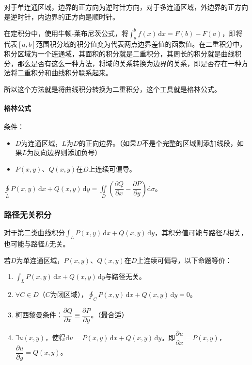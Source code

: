 \documentclass[UTF8, 12pt]{ctexart}
\begin{document}
对于单连通区域，边界的正方向为逆时针方向，对于多连通区域，外边界的正方向是逆时针，内边界的正方向是顺时针。

在定积分中，使用牛顿-莱布尼茨公式，将$\int_a^bf(x)\,\textrm{d}x=F(b)-F(a)$，即将代表$[a,b]$范围积分域的积分值变为代表两点边界差值的函数值。在二重积分中，积分区域为一个连通域，其面积的积分就是二重积分，其周长的积分就是曲线积分，那么是否有这么一种方法，将域的关系转换为边界的关系，即是否存在一种方法将二重积分和曲线积分联系起来。

所以这个方法就是将曲线积分转换为二重积分，这个工具就是格林公式。

\paragraph{格林公式} \leavevmode \medskip

条件：

\begin{itemize}
    \item $D$为连通区域，$L$为$D$的正向边界。（如果$D$不是个完整的区域则添加线段，如果$L$为反向边界则添加负号）
    \item $P(x,y)$、$Q(x,y)$在$D$上连续可偏导。
\end{itemize}

$\displaystyle{\oint\limits_LP(x,y)\,\textrm{d}x+Q(x,y)\,\textrm{d}y=\iint\limits_D\left(\dfrac{\partial Q}{\partial x}-\dfrac{\partial P}{\partial y}\right)\textrm{d}\sigma}$。

\subsubsection{路径无关积分}

对于第二类曲线积分$\int_LP(x,y)\,\textrm{d}x+Q(x,y)\,\textrm{d}y$，其积分值可能与路径$L$相关，也可能与路径$L$无关。

若$D$为单连通区域，$P(x,y)$、$Q(x,y)$在$D$上连续可偏导，以下命题等价：

\begin{enumerate}
    \item $\int_LP(x,y)\,\textrm{d}x+Q(x,y)\,\textrm{d}y$与路径无关。
    \item $\forall C\in D$（$C$为闭区域），$\oint_CP(x,y)\,\textrm{d}x+Q(x,y)\,\textrm{d}y=0$。
    \item 柯西黎曼条件：$\dfrac{\partial Q}{\partial x}\equiv\dfrac{\partial P}{\partial y}$。（最合适）
    \item $\exists u(x,y)$，使得$\textrm{d}u=P(x,y)\,\textrm{d}x+Q(x,y)\,\textrm{d}y$。即$\dfrac{\partial u}{\partial x}=P(x,y)$，$\dfrac{\partial u}{\partial y}=Q(x,y)$。
\end{enumerate}
\end{document}

